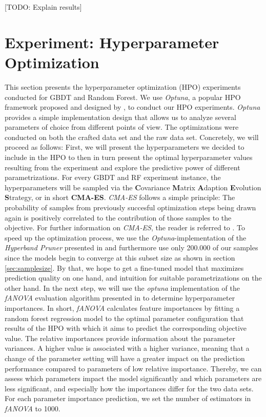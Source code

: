 [TODO: Explain results]
\section{Experiment: Hyperparameter Optimization}\label{sec:hpo}
This section presents the hyperparameter optimization (HPO) experiments conducted for GBDT and Random Forest.
We use \textit{Optuna}, a popular HPO framework proposed and designed by \cite{akiba2019optuna}, to conduct our HPO experiments. 
\textit{Optuna} provides a simple implementation design that allows us to analyze several parameters of choice from different points of view. 
The optimizations were conducted on both the crafted data set and the raw data set. 
Concretely, we will proceed as follows: First, we will present the hyperparameters we decided to include in the HPO to then in turn present the optimal hyperparameter values resulting from the experiment and explore the predictive power of different parametrizations. 
For every GBDT and RF experiment instance, the hyperparameters will be sampled via the \textbf{C}ovariance \textbf{M}atrix \textbf{A}daption \textbf{E}volution \textbf{S}trategy, or in short \textbf{CMA-ES}. 
\textit{CMA-ES} follows a simple principle: The probability of samples from previously succesful optimization steps being drawn again is positively correlated to the contribution of those samples to the objective. For further information on \textit{CMA-ES}, the reader is referred to \cite{hansen2016cma}. 
To speed up the optimization process, we use the \textit{Optuna}-implementation of the \textit{Hyperband Pruner} presented in \cite{li2018hyperband} and furthermore use only 200.000 of our samples since the models begin to converge at this subset size as shown in section \ref{sec:samplesize}. By that, we hope to get a fine-tuned model that maximizes prediction quality on one hand, and intuition for suitable parametrizations on the other hand.
In the next step, we will use the \textit{optuna} implementation of the \textit{fANOVA} evaluation algorithm presented in \cite{fANOVA} to determine hyperparameter importances. 
In short, \textit{fANOVA} calculates feature importances by fitting a random forest regression model to the optimal parameter configuration that results of the HPO with which it aims to predict the corresponding objective value. The relative importances provide information about the parameter variances. A higher value is associated with a higher variance, meaning that a change of the parameter setting will have a greater impact on the prediction performance compared to parameters of low relative importance. Thereby, we can assess which parameters impact the model significantly and which parameters are less significant, and especially how the importances differ for the two data sets. For each parameter importance prediction, we set the number of estimators in \textit{fANOVA} to 1000.
